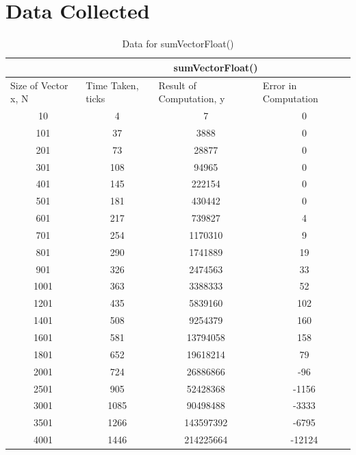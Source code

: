 \documentclass{article}
\begin{document}
\newpage
\appendix
\section{Data Collected}
\begin{table}[h!]
\centering
\begin{tabular}{c|c|c|c|}
\cline{2-4}
 & \multicolumn{3}{c|}{sumVectorFloat()} \\ \hline
\multicolumn{1}{|l|}{Size of Vector x, N} & \multicolumn{1}{l|}{Time Taken, ticks} & \multicolumn{1}{l|}{Result of Computation, y} & \multicolumn{1}{l|}{Error in Computation} \\ \hline
\multicolumn{1}{|c|}{10} & 4 & 7 & 0 \\ \hline
\multicolumn{1}{|c|}{101} & 37 & 3888 & 0 \\ \hline
\multicolumn{1}{|c|}{201} & 73 & 28877 & 0 \\ \hline
\multicolumn{1}{|c|}{301} & 108 & 94965 & 0 \\ \hline
\multicolumn{1}{|c|}{401} & 145 & 222154 & 0 \\ \hline
\multicolumn{1}{|c|}{501} & 181 & 430442 & 0 \\ \hline
\multicolumn{1}{|c|}{601} & 217 & 739827 & 4 \\ \hline
\multicolumn{1}{|c|}{701} & 254 & 1170310 & 9 \\ \hline
\multicolumn{1}{|c|}{801} & 290 & 1741889 & 19 \\ \hline
\multicolumn{1}{|c|}{901} & 326 & 2474563 & 33 \\ \hline
\multicolumn{1}{|c|}{1001} & 363 & 3388333 & 52 \\ \hline
\multicolumn{1}{|c|}{1201} & 435 & 5839160 & 102 \\ \hline
\multicolumn{1}{|c|}{1401} & 508 & 9254379 & 160 \\ \hline
\multicolumn{1}{|c|}{1601} & 581 & 13794058 & 158 \\ \hline
\multicolumn{1}{|c|}{1801} & 652 & 19618214 & 79 \\ \hline
\multicolumn{1}{|c|}{2001} & 724 & 26886866 & -96 \\ \hline
\multicolumn{1}{|c|}{2501} & 905 & 52428368 & -1156 \\ \hline
\multicolumn{1}{|c|}{3001} & 1085 & 90498488 & -3333 \\ \hline
\multicolumn{1}{|c|}{3501} & 1266 & 143597392 & -6795 \\ \hline
\multicolumn{1}{|c|}{4001} & 1446 & 214225664 & -12124 \\ \hline
\end{tabular}
\caption{Data for sumVectorFloat()}
\end{table}
\end{document}

